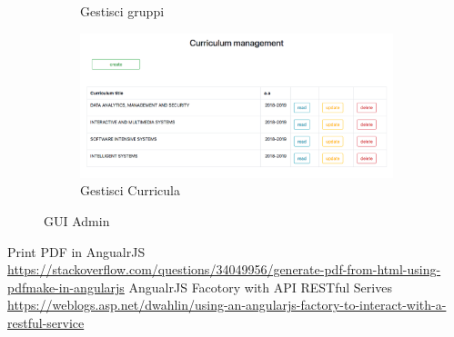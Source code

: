 \documentclass{article}
\begin{document}
\begin{figure}[!h]
\begin{subfigure}[b]{0.475\textwidth}
            \caption[]%
            {{\small Gestisci gruppi }}    
            \label{fig:Group Management}
        \end{subfigure}
        \quad
        \begin{subfigure}[b]{0.475\textwidth}   
            \centering 
            \includegraphics[width=\textwidth]{img/curriculumadmin.png}
            \caption[]%
            {{\small Gestisci Curricula }}    
            \label{fig:Curriculum Management}
        \end{subfigure}
        \caption[  ]
        {\small GUI Admin} 
        \label{fig:Student GUI}
    \end{figure}


\newpage


\begin{thebibliography}{Bibliografia}
  Print PDF in AngualrJS \url{https://stackoverflow.com/questions/34049956/generate-pdf-from-html-using-pdfmake-in-angularjs}
  AngualrJS Facotory with API RESTful Serives \url{https://weblogs.asp.net/dwahlin/using-an-angularjs-factory-to-interact-with-a-restful-service}

\end{thebibliography}
\end{document}
